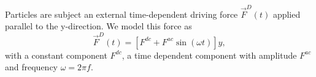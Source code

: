 \documentclass[twocolumn,preprintnumbers,amsmath,amssymb,aps,prx]{revtex4}
\begin{document}
 Particles are subject an external time-dependent driving force
$\vec{F}^{D}(t)$
applied parallel to the y-direction.
We model this force as
\begin{equation}
  \vec{F}^{D}(t) = [F^{dc} + F^{ac} \sin(\omega t)] \hat{y},
    \label{eq:drive}
\end{equation}
with %
a constant component $F^{dc}$,
a time dependent component with amplitude $F^{ac}$
and frequency $\omega = 2 \pi f$.
\end{document}
